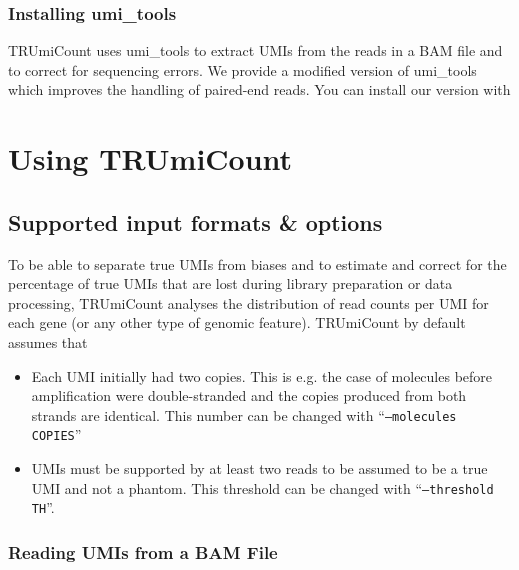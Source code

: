 \documentclass[10pt]{article}
\begin{document}
\subsubsection*{Installing umi\_tools}

TRUmiCount uses umi\_tools to extract UMIs from the reads in a BAM file and to correct for sequencing errors. We provide a modified version of umi\_tools which improves the handling of paired-end reads. You can install our version with


\pagebreak
\section{Using TRUmiCount}

\subsection{Supported input formats \& options}

To be able to separate true UMIs from biases and to estimate and correct for the percentage of true UMIs that are lost during library preparation or data processing, TRUmiCount analyses the distribution of read counts per UMI for each gene (or any other type of genomic feature). TRUmiCount by default assumes that

\begin{itemize}
  \item Each UMI initially had two copies. This is e.g. the case of molecules before amplification were double-stranded and the copies produced from both strands are identical. This number can be changed with ``\texttt{--molecules COPIES}''
  \item UMIs must be supported by at least two reads to be assumed to be a true UMI and not a phantom. This threshold can be changed with ``\texttt{--threshold TH}''.
\end{itemize}

\subsubsection*{Reading UMIs from a BAM File}
\end{document}
